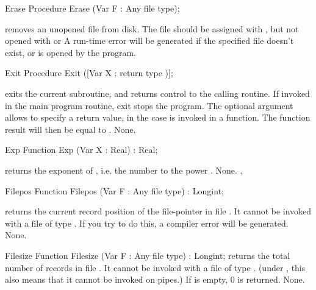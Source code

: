\documentclass{report}
\begin{document}

\begin{procedure}{Erase}
\Declaration
Procedure Erase (Var F : Any file type);

\Description
{} removes an unopened file from disk. The file should be
assigned with , but not opened with  or 
\Errors
A run-time error will be generated if the specified file doesn't exist, or
is opened by the program.
\SeeAlso
{}
\end{procedure}


\begin{procedure}{Exit}
\Declaration
Procedure Exit ([Var X : return type )];

\Description
{} exits the current subroutine, and returns control to the calling
routine. If invoked in the main program routine, exit stops the program.
The optional argument  allows to specify a return value, in the case
 is invoked in a function. The function result will then be
equal to .
\Errors
None.
\SeeAlso
{}
\end{procedure}


\begin{function}{Exp}
\Declaration
Function Exp (Var X : Real) : Real;

\Description
{} returns the exponent of , i.e. the number  to the
power .
\Errors
None.
\SeeAlso
{}, 
\end{function}


\begin{function}{Filepos}
\Declaration
Function Filepos (Var F : Any file type) : Longint;

\Description
{} returns the current record position of the file-pointer in file
. It cannot be invoked with a file of type . If you try to
do this, a compiler error will be generated.
\Errors
None.
\SeeAlso
{}
\end{function}


\begin{function}{Filesize}
\Declaration
Function Filesize (Var F : Any file type) : Longint;
\Description
{} returns the total number of records in file .
It cannot be invoked with a file of type . (under \linux, this
also means that it cannot be invoked on pipes.)
If  is empty, 0 is returned.
\Errors
None.
\SeeAlso
{}
\end{function}
\end{document}
